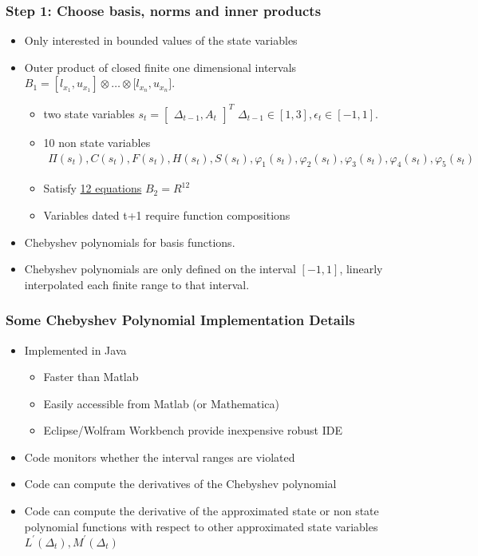 \documentclass[tikz]{beamer}
\begin{document}
\begin{frame}

\frametitle{Step 1: Choose basis, norms and inner products }

\begin{itemize}
\item Only interested in bounded values of the state variables
\item Outer product of closed finite one dimensional intervals
  $B_{1}=[l_{x_{1}},u_{x_{1}}]\otimes \ldots \otimes \lbrack
  l_{x_{n}},u_{x_{n}}]$.
  \begin{itemize}
  \item two state variables $s_t =
    \begin{bmatrix}
      \Delta_{t-1}, A_{t}
    \end{bmatrix}^T$ $\Delta _{t-1} \in [1,3], \epsilon_t \in [-1,1]$.
  \item 10 non state variables
    \begin{gather*}
      \Pi(s_{t}), C(s_{t}), F(s_{t}), H(s_{t}), S(s_{t}),
      \varphi_1(s_{t}),\varphi_{2}(s_{t}),\varphi_{3}(s_{t}),
      \varphi_{4}(s_{t}),\varphi_5(s_{t})
    \end{gather*}
  \item Satisfy \hyperref[eqns]{12 equations} $B_2=R^{12}$
  \item Variables dated t+1 require function compositions
  \end{itemize}
\item Chebyshev polynomials for basis functions.
\item Chebyshev polynomials are only defined on the interval $[-1,1]$,
  linearly interpolated each finite range to that interval.
\end{itemize}

\end{frame}
\begin{frame}

\frametitle{Some Chebyshev Polynomial Implementation Details}
\begin{itemize}
\item Implemented in Java
  \begin{itemize}
  \item Faster than Matlab
  \item Easily accessible from Matlab (or Mathematica)
  \item Eclipse/Wolfram Workbench provide inexpensive robust IDE
  \end{itemize}
\item Code monitors whether the interval ranges are violated
\item Code can compute the derivatives of the Chebyshev polynomial
\item Code can compute the derivative of the approximated state or non
  state polynomial functions with respect to other approximated state
  variables $L^\prime(\Delta_t), M^\prime(\Delta_t)$
\end{itemize}



\end{frame}
\end{document}
